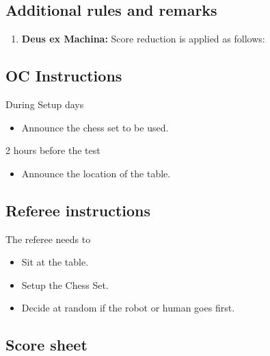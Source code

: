 \subsection*{Additional rules and remarks}
\begin{enumerate}
	\item \textbf{Deus ex Machina:} Score reduction is applied as follows:
	\begin{itemize}[nosep]
	\end{itemize}
\end{enumerate}

\subsection*{OC Instructions}
During Setup days
\begin{itemize}[nosep]
	\item Announce the chess set to be used.
\end{itemize}

2 hours before the test
\begin{itemize}[nosep]
	\item Announce the location of the table.
\end{itemize}

\subsection*{Referee instructions}
The referee needs to
\begin{itemize}[nosep]
	\item Sit at the table.
	\item Setup the Chess Set.
	\item Decide at random if the robot or human goes first.
\end{itemize}


\subsection*{Score sheet}

